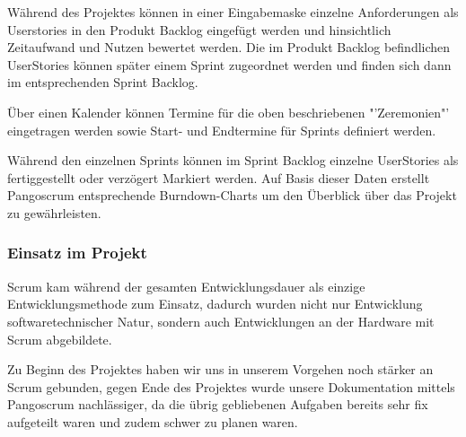 Während des Projektes können in einer Eingabemaske einzelne Anforderungen als Userstories in den Produkt Backlog eingefügt werden und hinsichtlich Zeitaufwand und Nutzen bewertet werden. Die im Produkt Backlog befindlichen UserStories können später einem Sprint zugeordnet werden und finden sich dann im entsprechenden Sprint Backlog.

Über einen Kalender können Termine für die oben beschriebenen "'Zeremonien"' eingetragen werden sowie Start- und Endtermine für Sprints definiert werden.

Während den einzelnen Sprints können im Sprint Backlog einzelne UserStories als fertiggestellt oder verzögert Markiert werden. Auf Basis dieser Daten erstellt Pangoscrum entsprechende Burndown-Charts um den Überblick über das Projekt zu gewährleisten.

\subsubsection{Einsatz im Projekt}
Scrum kam während der gesamten Entwicklungsdauer als einzige Entwicklungsmethode zum Einsatz, dadurch wurden nicht nur Entwicklung softwaretechnischer Natur, sondern auch Entwicklungen an der Hardware mit Scrum abgebildete. 

Zu Beginn des Projektes haben wir uns in unserem Vorgehen noch stärker an Scrum gebunden, gegen Ende des Projektes wurde unsere Dokumentation mittels Pangoscrum nachlässiger, da die übrig gebliebenen Aufgaben bereits sehr fix aufgeteilt waren und zudem schwer zu planen waren.